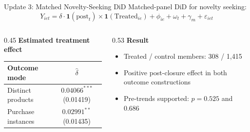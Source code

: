 \documentclass[aspectratio=169]{beamer}  %
\begin{document}
\begin{frame}{Update 3: Matched Novelty-Seeking DiD}
Matched-panel DiD for novelty seeking:
\begingroup
\small
\[
Y_{iet} =
\delta \cdot \mathbf{1}(\text{post}_{t}) \times \mathbf{1}(\text{Treated}_{ie})
+ \phi_{ie} + \omega_t + \gamma_m + \varepsilon_{iet}
\]
\endgroup

\begin{columns}[T]
\begin{column}{0.45\linewidth}
\textbf{Estimated treatment effect}
\begin{table}[h]
\centering
\scriptsize
\begin{tabular}{lc}
\toprule
Outcome mode & $\hat{\delta}$ \\
\midrule
Distinct products & $0.04066^{***}$ (0.01419) \\
Purchase instances & $0.02991^{**}$ (0.01435) \\
\bottomrule
\end{tabular}
\end{table}
\end{column}
\begin{column}{0.53\linewidth}
\textbf{Result}
\begin{itemize}
    \item Treated / control members: 308 / 1,415
    \item Positive post-closure effect in both outcome constructions
    \item Pre-trends supported: $p=0.525$ and $0.686$
\end{itemize}
\end{column}
\end{columns}
\end{frame}
\end{document}

